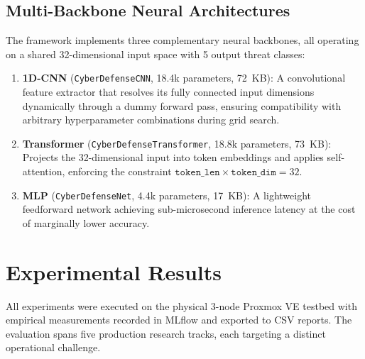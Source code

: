 \documentclass[journal,10pt,twocolumn]{IEEEtran}
\begin{document}
\subsection{Multi-Backbone Neural Architectures}
The framework implements three complementary neural backbones, all operating on a shared 32-dimensional input space with 5 output threat classes:
\begin{enumerate}
    \item \textbf{1D-CNN} (\texttt{CyberDefenseCNN}, 18.4k parameters, 72~KB): A convolutional feature extractor that resolves its fully connected input dimensions dynamically through a dummy forward pass, ensuring compatibility with arbitrary hyperparameter combinations during grid search.
    \item \textbf{Transformer} (\texttt{CyberDefenseTransformer}, 18.8k parameters, 73~KB): Projects the 32-dimensional input into token embeddings and applies self-attention, enforcing the constraint $\texttt{token\_len} \times \texttt{token\_dim} = 32$.
    \item \textbf{MLP} (\texttt{CyberDefenseNet}, 4.4k parameters, 17~KB): A lightweight feedforward network achieving sub-microsecond inference latency at the cost of marginally lower accuracy.
\end{enumerate}

\section{Experimental Results}

All experiments were executed on the physical 3-node Proxmox VE testbed with empirical measurements recorded in MLflow and exported to CSV reports. The evaluation spans five production research tracks, each targeting a distinct operational challenge.
\end{document}
